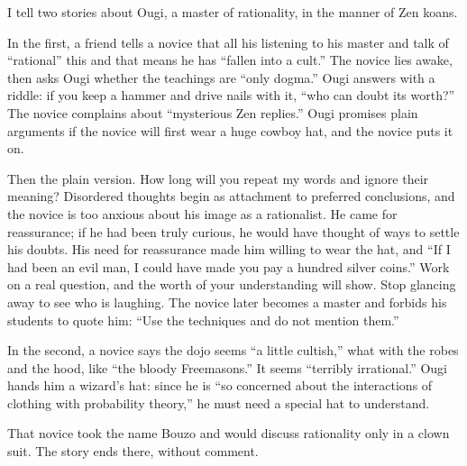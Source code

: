 
I tell two stories about Ougi, a master of rationality, in the manner of Zen koans.

In the first, a friend tells a novice that all his listening to his master and talk of ``rational'' this and that means he has ``fallen into a cult.'' The novice lies awake, then asks Ougi whether the teachings are ``only dogma.'' Ougi answers with a riddle: if you keep a hammer and drive nails with it, ``who can doubt its worth?'' The novice complains about ``mysterious Zen replies.'' Ougi promises plain arguments if the novice will first wear a huge cowboy hat, and the novice puts it on.

Then the plain version. How long will you repeat my words and ignore their meaning? Disordered thoughts begin as attachment to preferred conclusions, and the novice is too anxious about his image as a rationalist. He came for reassurance; if he had been truly curious, he would have thought of ways to settle his doubts. His need for reassurance made him willing to wear the hat, and ``If I had been an evil man, I could have made you pay a hundred silver coins.'' Work on a real question, and the worth of your understanding will show. Stop glancing away to see who is laughing. The novice later becomes a master and forbids his students to quote him: ``Use the techniques and do not mention them.'' 

In the second, a novice says the dojo seems ``a little cultish,'' what with the robes and the hood, like ``the bloody Freemasons.'' It seems ``terribly irrational.'' Ougi hands him a wizard's hat: since he is ``so concerned about the interactions of clothing with probability theory,'' he must need a special hat to understand. 

That novice took the name Bouzo and would discuss rationality only in a clown suit. The story ends there, without comment.
